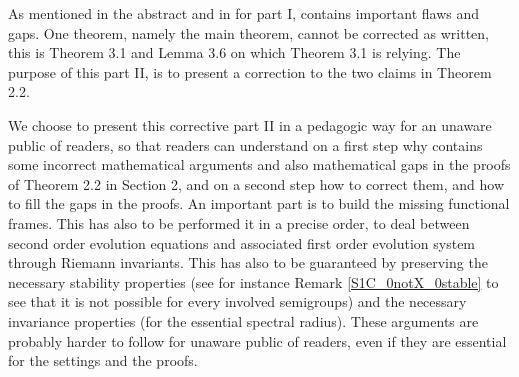 \documentclass[10pt, english]{article}
\begin{document}
\vskip 2mm

As mentioned in the abstract and in \cite{AB2023I} for part I, \cite{SW2003} contains important flaws and gaps. One theorem, namely the main theorem, cannot be corrected as written, this is Theorem 3.1 and Lemma 3.6 on which Theorem 3.1 is relying.
The purpose of this part II, is to present a correction to the two claims in Theorem 2.2.

We choose to present this corrective part II in a pedagogic way for an unaware public of readers, so that readers can understand on a first step why \cite{SW2003} contains some incorrect mathematical arguments and also mathematical gaps in the proofs of Theorem 2.2 in Section 2, and on a second step how to correct them, and how to fill the gaps in the proofs. An important part is to build the missing functional frames. This has also to be performed it in a precise order, to deal between second order evolution equations and associated first order evolution system through Riemann invariants. This has also to be guaranteed by preserving the necessary stability properties (see for instance Remark \ref{S1C_0notX_0stable} to see that it is not possible for every involved semigroups) and the necessary invariance properties (for the essential spectral radius). These arguments are probably harder to follow for unaware public of readers, even if they are essential for the settings and the proofs.
\end{document}

